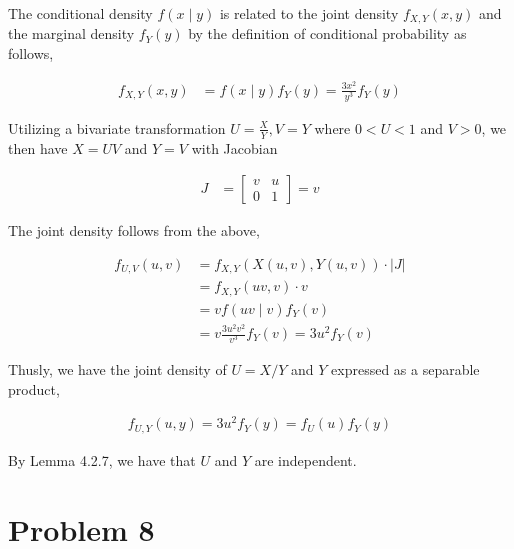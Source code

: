 \documentclass[11pt]{article}
\begin{document}
The conditional density $f(x \mid y)$ is related to the joint density
$f_{X,Y}(x,y)$ and the marginal density $f_Y(y)$ by the definition of
conditional probability as follows,

\begin{align*}
  f_{X,Y}(x,y) &= f(x \mid y) f_Y(y) = \frac{3x^2}{y^3} f_Y(y)
\end{align*}

Utilizing a bivariate transformation $U = \frac{X}{Y}, V = Y$ where
$0<U<1$ and $V>0$, we then have $X = UV$ and $Y=V$ with Jacobian

\begin{align*}
  J &= \begin{bmatrix} v & u \\ 0 & 1 \end{bmatrix} = v
\end{align*}

The joint density follows from the above,

\begin{align*}
  f_{U,V} (u,v) &= f_{X,Y}(X(u,v), Y(u,v)) \cdot \left| J \right| \\
  &= f_{X,Y}(uv, v) \cdot v \\
  &= v f(uv \mid v) f_Y(v) \\
  &= v \frac{3u^2v^2}{v^3} f_Y(v) = 3u^2 f_Y(v)
\end{align*}

Thusly, we have the joint density of $U = X/Y$ and $Y$ expressed as a
separable product,

\begin{align*}
  f_{U,Y}(u,y) = 3u^2 f_Y(y) = f_U(u) f_Y(y)
\end{align*}

By Lemma 4.2.7, we have that $U$ and $Y$ are independent.

\section*{Problem 8}
\end{document}
